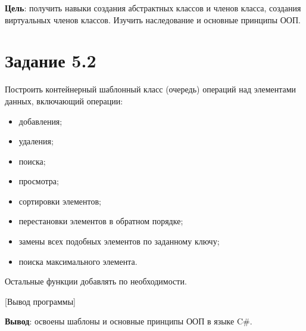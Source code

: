 \documentclass{bsuir}
\newcommand{\csharp}{C{\liberationrm\#}}
\begin{document}

    \textbf{Цель}: получить навыки создания абстрактных классов и членов класса,
    создания виртуальных членов классов. Изучить наследование и основные принципы
    ООП.

    \section*{Задание 5.2}

    Построить контейнерный шаблонный класс (очередь) операций над элементами
    данных, включающий операции:

    \begin{itemize}
        \item добавления;
        \item удаления;
        \item поиска;
        \item просмотра;
        \item сортировки элементов;
        \item перестановки элементов в обратном порядке;
        \item замены всех подобных элементов по заданному ключу;
        \item поиска максимального элемента.
    \end{itemize}

    Остальные функции добавлять по необходимости.


    [Вывод программы]

    \textbf{Вывод}: освоены шаблоны и основные принципы ООП в языке \csharp.
\end{document}
